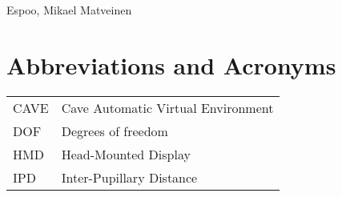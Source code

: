 \documentclass[12pt,a4paper,oneside,pdftex]{report}
\newcommand{\DATE}{}
\newcommand{\AUTHOR}{Mikael Matveinen}
\begin{document}
\vskip 10mm

\noindent Espoo, \DATE
\vskip 5mm
\noindent\AUTHOR

\cleardoublepage
% 

\chapter*{Abbreviations and Acronyms}


\noindent
\begin{longtable}{@{}p{}p{}@{}}
CAVE & Cave Automatic Virtual Environment \\
DOF & Degrees of freedom \\
HMD & Head-Mounted Display \\
IPD & Inter-Pupillary Distance
\end{longtable}


\cleardoublepage
\tableofcontents



\label{pages-prelude}
\cleardoublepage
\end{document}
